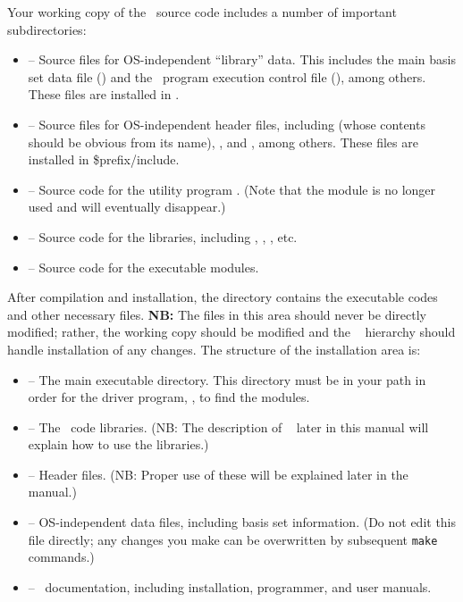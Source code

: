 Your working copy of the \PSIthree\ source code includes a number of
important subdirectories:

\begin{itemize}
\item {} -- Source files for
  OS-independent ``library'' data.  This includes the main basis set
  data file () and the \PSIthree\ program execution
  control file (), among others.  These files are
  installed in .

\item {} -- Source files for
  OS-independent header files, including  (whose
  contents should be obvious from its name), , and
  , among others.  These files are installed in
  \$prefix/include.

\item {} -- Source code for the utility
  program .  (Note that the  module is
  no longer used and will eventually disappear.)

\item {} -- Source code for the
  libraries, including , ,
  , etc.

\item {} -- Source code for the
  executable modules.
\end{itemize}

After compilation and installation, the  directory
contains the executable codes and other necessary files.  {\bf NB:}
The files in this area should never be directly modified; rather, the
working copy should be modified and the \PSIthree\ 
hierarchy should handle installation of any changes.  The structure of
the installation area is:

\begin{itemize}
\item {} -- The main executable directory.  This
  directory must be in your path in order for the driver program,
  , to find the modules.

\item {} -- The \PSIthree\ code libraries.  (NB: The
  description of \PSIthree\  later in this manual will
  explain how to use the libraries.)

\item {} -- Header files.  (NB: Proper use of
  these will be explained later in the manual.)

\item {} -- OS-independent data files, including
  basis set information.  (Do not edit this file directly; any changes
  you make can be overwritten by subsequent {\tt make} commands.)

\item {} -- \PSIthree\ documentation, including
  installation, programmer, and user manuals.
\end{itemize}

